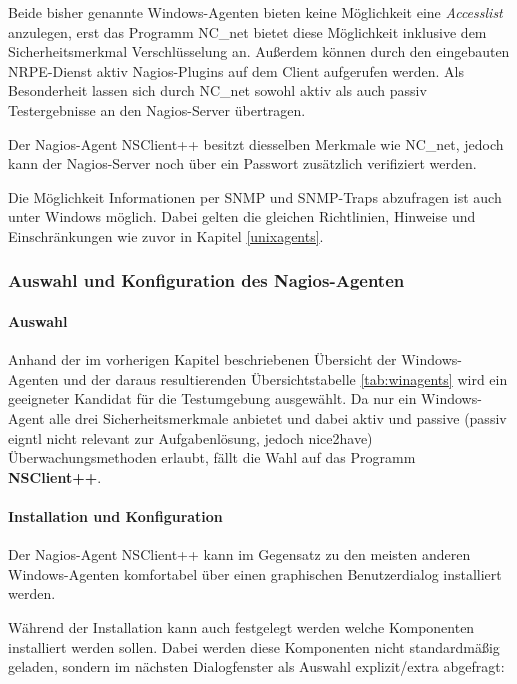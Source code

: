 Beide bisher genannte Windows-Agenten bieten keine Möglichkeit eine \textit{Accesslist} anzulegen, erst das Programm NC\_net bietet diese Möglichkeit inklusive dem Sicherheitsmerkmal Verschlüsselung an.
Außerdem können durch den eingebauten \gls{NRPE}-Dienst aktiv Nagios-Plugins auf dem Client aufgerufen werden.
Als Besonderheit lassen sich durch NC\_net sowohl aktiv als auch passiv Testergebnisse an den Nagios-Server übertragen. 

Der Nagios-Agent NSClient++ besitzt diesselben Merkmale wie NC\_net, jedoch kann der Nagios-Server noch über ein Passwort zusätzlich verifiziert werden.

Die Möglichkeit Informationen per \gls{SNMP} und \gls{SNMP}-Traps abzufragen ist auch unter Windows möglich.
Dabei gelten die gleichen Richtlinien, Hinweise und Einschränkungen wie zuvor in Kapitel \ref{unixagents}.

\subsubsection{Auswahl und Konfiguration des Nagios-Agenten}

\paragraph{Auswahl}
Anhand der im vorherigen Kapitel beschriebenen Übersicht der Windows-Agenten und der daraus resultierenden Übersichtstabelle \ref{tab:winagents} wird ein geeigneter Kandidat für die Testumgebung ausgewählt.
Da nur ein Windows-Agent alle drei Sicherheitsmerkmale anbietet und dabei aktiv und passive (passiv eigntl nicht relevant zur Aufgabenlösung, jedoch nice2have) Überwachungsmethoden erlaubt, fällt die Wahl auf das Programm \textbf{NSClient++}.

\paragraph{Installation und Konfiguration}

Der Nagios-Agent NSClient++ kann im Gegensatz zu den meisten anderen Windows-Agenten komfortabel über einen graphischen Benutzerdialog installiert werden.


Während der Installation kann auch festgelegt werden welche Komponenten installiert werden sollen.
Dabei werden diese Komponenten nicht standardmäßig geladen, sondern im nächsten Dialogfenster als Auswahl explizit/extra abgefragt:

